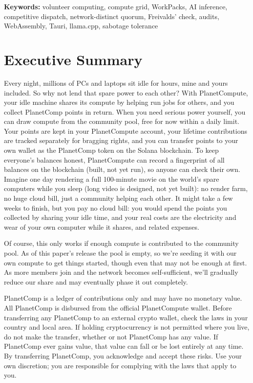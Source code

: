 \documentclass[11pt,a4paper]{article}
\theoremstyle{definition}
\theoremstyle{plain}
\begin{document}
\noindent\textbf{Keywords:} volunteer computing, compute grid, WorkPacks, AI inference, competitive dispatch,
network-distinct quorum, Freivalds' check, audits, WebAssembly, Tauri, llama.cpp, sabotage tolerance

\section*{Executive Summary}
Every night, millions of PCs and laptops sit idle for hours, mine and yours included. So why not lend that spare
power to each other? With PlanetCompute, your idle machine shares its compute by helping run jobs for others, and
you collect PlanetComp points in return. When you need serious power yourself, you can draw compute from the community pool, free
for now within a daily limit. Your points are kept in your PlanetCompute account, your lifetime contributions are
tracked separately for bragging rights, and you can transfer points to your own wallet as the PlanetComp token on the
Solana blockchain. To keep everyone's balances honest, PlanetCompute can record a fingerprint of all balances on the blockchain (built, not yet run), so anyone can check their own. Imagine one day rendering a full 100-minute movie on the world's spare computers while you sleep (long
video is designed, not yet built): no render farm, no huge cloud bill, just a community helping each other. It might take a few weeks to finish, but you pay no cloud bill: you would spend the points you collected by sharing
your idle time, and your real costs are the electricity and wear of your own computer while it shares, and related expenses.

Of course, this only works if enough compute is contributed to the community pool. As of this paper's release the
pool is empty, so we're seeding it with our own compute to get things started, though even that may not be enough
at first. As more members join and the network becomes self-sufficient, we'll gradually reduce our share and
may eventually phase it out completely.

\begin{pcnotice}
PlanetComp is a ledger of contributions only and may have no monetary value. All PlanetComp is disbursed from the
official PlanetCompute wallet. Before transferring any PlanetComp to an external crypto wallet, check the laws in
your country and local area. If holding cryptocurrency is not permitted where you live, do not make the transfer,
whether or not PlanetComp has any value. If PlanetComp ever gains value, that value can fall or be lost entirely at
any time. By transferring PlanetComp, you acknowledge and accept these risks. Use your own discretion; you are
responsible for complying with the laws that apply to you.
\end{pcnotice}
\end{document}
